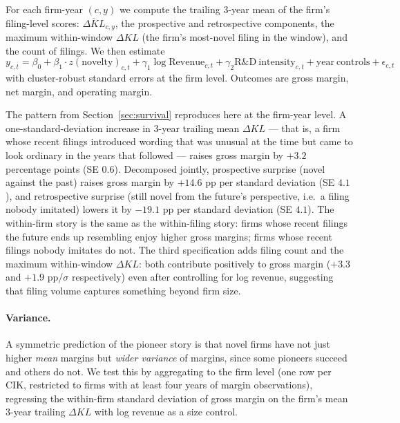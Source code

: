 \documentclass[11pt]{article}
\begin{document}
For each firm-year $(c, y)$ we compute the trailing 3-year mean of the
firm's filing-level scores: $\overline{\Delta KL}_{c, y}$, the
prospective and retrospective components, the maximum within-window
$\Delta KL$ (the firm's most-novel filing in the window), and the
count of filings. We then estimate
\[
y_{c,t} = \beta_0 + \beta_1 \cdot z(\text{novelty})_{c,t} + \gamma_1 \log \mathrm{Revenue}_{c,t} + \gamma_2 \mathrm{R\&D~intensity}_{c,t} + \mathrm{year~controls} + \epsilon_{c,t}
\]
with cluster-robust standard errors at the firm level. Outcomes are
gross margin, net margin, and operating margin.

\begin{table}[h]
\centering
\caption{OLS regressions of profitability outcomes on trademark
novelty, with cluster-robust standard errors at the firm level.
Coefficients are in profitability-units per one standard deviation of
the predictor (so a coefficient of $+0.029$ on gross margin means
``+2.9 percentage points''). Each block is a separate specification.}
\label{tab:financials}

\end{table}

The pattern from Section~\ref{sec:survival} reproduces here at the
firm-year level. A one-standard-deviation increase in 3-year trailing
mean $\Delta KL$ --- that is, a firm whose recent filings introduced
wording that was unusual at the time but came to look ordinary in the
years that followed --- raises gross margin by $+3.2$ percentage points
(SE $0.6$). Decomposed jointly, prospective surprise (novel against the
past) raises gross margin by $+14.6$ pp per standard deviation
(SE $4.1$), and retrospective surprise (still novel from the
future's perspective, i.e.\ a filing nobody imitated) lowers it by
$-19.1$ pp per standard deviation (SE $4.1$). The within-firm story is
the same as the within-filing story: firms whose recent filings the
future ends up resembling enjoy higher gross margins; firms whose
recent filings nobody imitates do not. The third specification adds
filing count and the maximum within-window $\Delta KL$: both contribute
positively to gross margin ($+3.3$ and $+1.9$ pp/$\sigma$ respectively)
even after controlling for log revenue, suggesting that filing volume
captures something beyond firm size.

\paragraph{Variance.}
A symmetric prediction of the pioneer story is that novel firms have
not just higher \emph{mean} margins but \emph{wider variance} of
margins, since some pioneers succeed and others do not. We test this
by aggregating to the firm level (one row per CIK, restricted to firms
with at least four years of margin observations), regressing the
within-firm standard deviation of gross margin on the firm's mean
3-year trailing $\Delta KL$ with log revenue as a size control.
\end{document}
